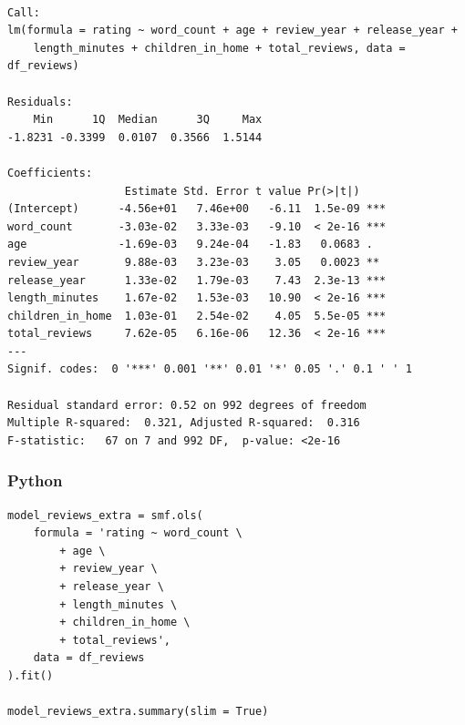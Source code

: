 \documentclass[
  letterpaper,
]{krantz}
\begin{document}
\begin{verbatim}

Call:
lm(formula = rating ~ word_count + age + review_year + release_year + 
    length_minutes + children_in_home + total_reviews, data = df_reviews)

Residuals:
    Min      1Q  Median      3Q     Max 
-1.8231 -0.3399  0.0107  0.3566  1.5144 

Coefficients:
                  Estimate Std. Error t value Pr(>|t|)    
(Intercept)      -4.56e+01   7.46e+00   -6.11  1.5e-09 ***
word_count       -3.03e-02   3.33e-03   -9.10  < 2e-16 ***
age              -1.69e-03   9.24e-04   -1.83   0.0683 .  
review_year       9.88e-03   3.23e-03    3.05   0.0023 ** 
release_year      1.33e-02   1.79e-03    7.43  2.3e-13 ***
length_minutes    1.67e-02   1.53e-03   10.90  < 2e-16 ***
children_in_home  1.03e-01   2.54e-02    4.05  5.5e-05 ***
total_reviews     7.62e-05   6.16e-06   12.36  < 2e-16 ***
---
Signif. codes:  0 '***' 0.001 '**' 0.01 '*' 0.05 '.' 0.1 ' ' 1

Residual standard error: 0.52 on 992 degrees of freedom
Multiple R-squared:  0.321, Adjusted R-squared:  0.316 
F-statistic:   67 on 7 and 992 DF,  p-value: <2e-16
\end{verbatim}

\subsubsection{Python}

\begin{verbatim}
model_reviews_extra = smf.ols(
    formula = 'rating ~ word_count \
        + age \
        + review_year \
        + release_year \
        + length_minutes \
        + children_in_home \
        + total_reviews',
    data = df_reviews
).fit()

model_reviews_extra.summary(slim = True)
\end{verbatim}
\end{document}
